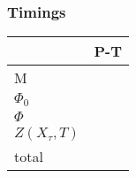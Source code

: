 \documentclass[a4paper,11pt]{article}
\numberwithin{equation}{section}
\DeclareMathOperator{\Frob}{F}           %
\providecommand{\Hrig}{H_{\text{rig}}}  %
\theoremstyle{definition}
\begin{document}
\subsubsection{Timings}

\begin{tabular}{l|l}
                 & \mbox{P-T}        \\
\hline                 
M                &                   \\
\hline                 
$\Phi_0$         &                   \\
\hline                 
$\Phi$           &                   \\
\hline
$Z(X_{\tau},T)$  &                   \\
\hline
total            &                   \\
\end{tabular}

\begin{comment}
This example is a surface and we have $p \geq n$, hence the matrix of Frobenius 
is automatically integral.  We aim to compute $5 p(T/5)$ instead of $p(T)$, 
following Remark~\ref{rem:N0Surfaces}.  This allows us to take $N_0 = 10$, 
$N_1 = N_2 = 11$, $N_3 = 21$, $N_3' = 23$, and $N_4 = 33$, together with 
$K_1 = 60$ and $K_2 = 13740$.

The Gauss--Manin connection matrix is computed in $323.55$~seconds and found 
to have denominator $r(t)$ of degree~$228$, which explains the large value 
of the $t$-adic parameter~$K_2$.  The matrix for $p^{-1} \Frob_p$ on 
$\Hrig^{n}(U_0)$ is computed in $0.01$~seconds.  The local 
solutions $C$ and $C^{-1}$ form the most time-consuming part in this example, 
requiring $1909.3$ and $342.22$~seconds.  The matrix product to determine the 
local expansion of $p^{-1} \Frob_p$ on $\Hrig^{n}(U/S)$ 
takes $262.6$~seconds. Finally, the analytic continuation and evaluation steps 
require $4.53$ and $0.18$~seconds, respectively.
\end{comment}




\end{document}
